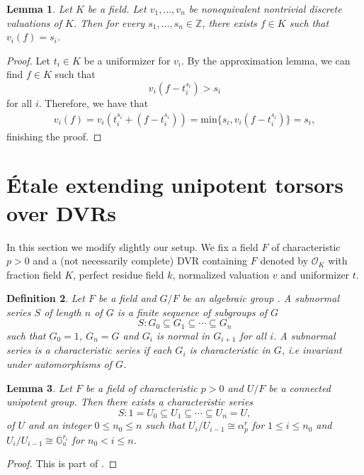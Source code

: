 \documentclass[a4paper,english,12pt]{amsart}
\newtheorem{definition}{Definition}[section]
\newtheorem{lemma}[definition]{Lemma}
\numberwithin{equation}{section}
\renewcommand{\leq}{\leqslant}
\renewcommand{\_}{\rule{0.25cm}{0.4pt}}
\begin{document}
\begin{lemma}\label{approximation for fields}
    Let $K$ be a field. Let $v_{1},\dots , v_{n}$ be nonequivalent nontrivial discrete valuations of $K$. Then for every $s_{1},\dots, s_{n}\in\mathbb{Z}$, there exists $f\in K$ such that $v_{i}(f)=s_{i}$.
\end{lemma}
\begin{proof}
    Let $t_{i}\in K$ be a uniformizer for $v_{i}$. By the approximation lemma, we can find $f\in K$ such that
    \[
    v_{i}(f-t_{i}^{s_{i}})>s_{i}
    \]
    for all $i$. Therefore, we have that
    \begin{align*}
        v_{i}(f)=v_{i}(t_{i}^{s_{i}}+(f-t_{i}^{s_{i}}))=\text{min}\{s_{i},v_{i}(f-t_{i}^{s_{i}})\}=s_{i},
    \end{align*}
    finishing the proof.
\end{proof}

\section{Étale extending unipotent torsors over DVRs}\label{3}
In this section we modify slightly our setup. We fix a field $F$ of characteristic $p>0$ and a (not necessarily complete) DVR containing $F$ denoted by $\mathcal{O}_{K}$ with fraction field $K$, perfect residue field $k$, normalized valuation $v$ and uniformizer $t$.

\begin{definition}
    Let $F$ be a field and $G/F$ be an algebraic group  . A subnormal series $S$ of length $n$ of $G$ is a finite sequence of subgroups of $G$
    \[
    S\colon G_{0}\subseteq G_{1}\subseteq \cdots \subseteq G_{n}
    \]
    such that $G_{0}=1$, $G_{n}=G$ and $G_{i}$ is normal in $G_{i+1}$ for all $i$. A subnormal series is a characteristic series if each $G_{i}$ is characteristic in $G$, i.e invariant under automorphisms of $G$.
\end{definition}

\begin{lemma}\label{serie unipotente corpo}
    Let $F$ be a field of characteristic $p>0$ and $U/F$ be a connected unipotent group. Then there exists a characteristic series
    \[
    S\colon 1=U_{0}\subseteq U_{1}\subseteq \cdots \subseteq U_{n}=U,
    \]
    of $U$ and an integer $0\leq n_{0}\leq n$ such that $U_{i}/U_{i-1}\cong \alpha_{p}^{r}$ for $1\leq i\leq n_{0}$ and $U_{i}/U_{i-1}\cong \mathbb{G}_{a}^{r_{i}}$ for $n_{0}< i\leq n$.
\end{lemma}
\begin{proof}
    This is part of \cite[Exp. XVII, Prop. 4.3.1]{SGA3}.
\end{proof}
\end{document}
